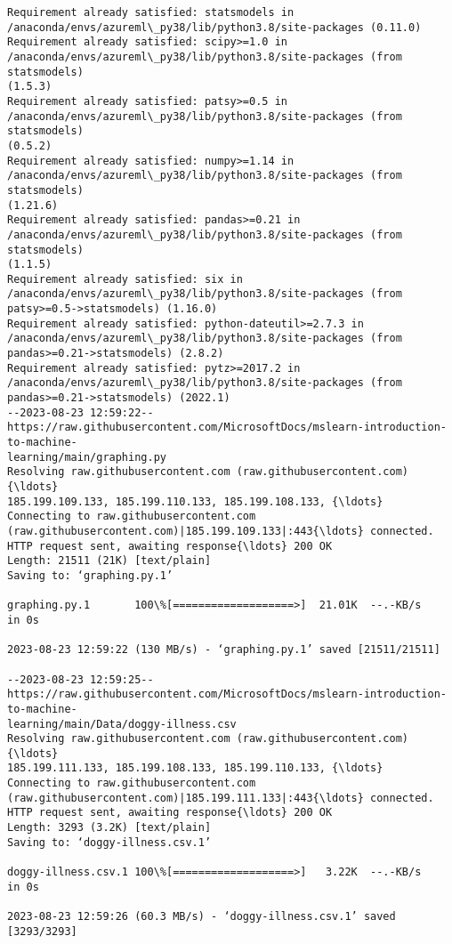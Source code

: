 \documentclass[11pt]{article}
\begin{document}
    \begin{Verbatim}[commandchars=\\\{\}]
Requirement already satisfied: statsmodels in
/anaconda/envs/azureml\_py38/lib/python3.8/site-packages (0.11.0)
Requirement already satisfied: scipy>=1.0 in
/anaconda/envs/azureml\_py38/lib/python3.8/site-packages (from statsmodels)
(1.5.3)
Requirement already satisfied: patsy>=0.5 in
/anaconda/envs/azureml\_py38/lib/python3.8/site-packages (from statsmodels)
(0.5.2)
Requirement already satisfied: numpy>=1.14 in
/anaconda/envs/azureml\_py38/lib/python3.8/site-packages (from statsmodels)
(1.21.6)
Requirement already satisfied: pandas>=0.21 in
/anaconda/envs/azureml\_py38/lib/python3.8/site-packages (from statsmodels)
(1.1.5)
Requirement already satisfied: six in
/anaconda/envs/azureml\_py38/lib/python3.8/site-packages (from
patsy>=0.5->statsmodels) (1.16.0)
Requirement already satisfied: python-dateutil>=2.7.3 in
/anaconda/envs/azureml\_py38/lib/python3.8/site-packages (from
pandas>=0.21->statsmodels) (2.8.2)
Requirement already satisfied: pytz>=2017.2 in
/anaconda/envs/azureml\_py38/lib/python3.8/site-packages (from
pandas>=0.21->statsmodels) (2022.1)
--2023-08-23 12:59:22--
https://raw.githubusercontent.com/MicrosoftDocs/mslearn-introduction-to-machine-
learning/main/graphing.py
Resolving raw.githubusercontent.com (raw.githubusercontent.com){\ldots}
185.199.109.133, 185.199.110.133, 185.199.108.133, {\ldots}
Connecting to raw.githubusercontent.com
(raw.githubusercontent.com)|185.199.109.133|:443{\ldots} connected.
HTTP request sent, awaiting response{\ldots} 200 OK
Length: 21511 (21K) [text/plain]
Saving to: ‘graphing.py.1’

graphing.py.1       100\%[===================>]  21.01K  --.-KB/s    in 0s

2023-08-23 12:59:22 (130 MB/s) - ‘graphing.py.1’ saved [21511/21511]

--2023-08-23 12:59:25--
https://raw.githubusercontent.com/MicrosoftDocs/mslearn-introduction-to-machine-
learning/main/Data/doggy-illness.csv
Resolving raw.githubusercontent.com (raw.githubusercontent.com){\ldots}
185.199.111.133, 185.199.108.133, 185.199.110.133, {\ldots}
Connecting to raw.githubusercontent.com
(raw.githubusercontent.com)|185.199.111.133|:443{\ldots} connected.
HTTP request sent, awaiting response{\ldots} 200 OK
Length: 3293 (3.2K) [text/plain]
Saving to: ‘doggy-illness.csv.1’

doggy-illness.csv.1 100\%[===================>]   3.22K  --.-KB/s    in 0s

2023-08-23 12:59:26 (60.3 MB/s) - ‘doggy-illness.csv.1’ saved [3293/3293]

    \end{Verbatim}
\end{document}
